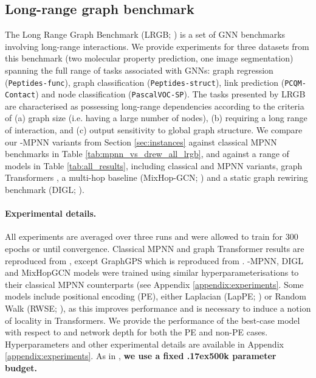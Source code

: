 \documentclass{article}
\newcommand{\mytilde}{\raise.17ex\hbox{}}
\theoremstyle{plain}
\theoremstyle{definition}
\theoremstyle{remark}
\begin{document}
\subsection{Long-range graph benchmark}
\label{sec:lrgb}
The Long Range Graph Benchmark (LRGB; \citet{dwivedi2022long}) is a set of GNN benchmarks involving long-range interactions. We provide experiments for three datasets from this benchmark (two molecular property prediction, one image segmentation) spanning the full range of tasks associated with GNNs: graph regression (\texttt{Peptides-func}), graph classification (\texttt{Peptides-struct}), link prediction (\texttt{PCQM-Contact}) and node classification (\texttt{PascalVOC-SP}). The tasks presented by LRGB are characterised as possessing long-range dependencies according to the criteria of (a) graph size (i.e. having a large number of nodes), (b) requiring a long range of interaction, and (c) output sensitivity to global graph structure. We compare our -MPNN variants from Section \ref{sec:instances} against classical MPNN benchmarks in Table \ref{tab:mpnn_vs_drew_all_lrgb}, and against a range of models in Table \ref{tab:all_results}, including classical and  MPNN variants,  graph Transformers \cite{dwivedi2022long, rampavsek2022recipe}, a multi-hop baseline (MixHop-GCN; \citet{abu2019mixhop}) and a static graph rewiring benchmark (DIGL; \citet{klicpera2019diffusion}).





\paragraph{Experimental details.}
All experiments are averaged over three runs and were allowed to train for 300 epochs or until convergence. Classical MPNN and graph Transformer results are reproduced from \citet{dwivedi2022long}, except GraphGPS which is reproduced from \citet{rampavsek2022recipe}. -MPNN, DIGL and MixHopGCN models were trained using similar hyperparameterisations to their classical MPNN counterparts (see Appendix \ref{appendix:experiments}. Some models include positional encoding (PE), either Laplacian (LapPE; \citet{dwivedi2020benchmarking}) or Random Walk (RWSE; \citet{dwivedi2021graph}), as this improves performance and is necessary to induce a notion of locality in Transformers. We provide the performance of the best-case  model with respect to  and network depth  for both the PE and non-PE cases. Hyperparameters and other experimental details are available in Appendix \ref{appendix:experiments}.
As in \citet{dwivedi2022long},
\textbf{we use a fixed \mytilde500k parameter budget.}
\end{document}
